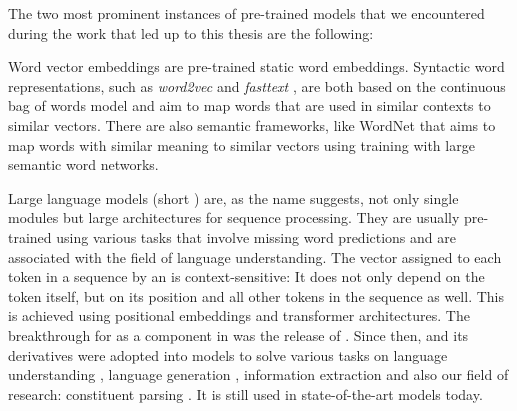 \documentclass[../document.tex]{subfiles}
\begin{document}
    The two most prominent instances of pre-trained models that we encountered during the work that led up to this thesis are the following:
    \begin{compactitem}
        \item
            Word vector embeddings are pre-trained static word embeddings.
            Syntactic word representations, such as \emph{word2vec} \citep{word2vec} and \emph{fasttext} \citep{fasttext}, are both based on the continuous bag of words model and aim to map words that are used in similar contexts to similar vectors.
            There are also semantic frameworks, like WordNet \citep{wordnet} that aims to map words with similar meaning to similar vectors using training with large semantic word networks.
        \item
            Large language models (short ) are, as the name suggests, not only single modules but large architectures for sequence processing.
            They are usually pre-trained using various tasks that involve missing word predictions and are associated with the field of language understanding.
            The vector assigned to each token in a sequence by an  is context-sensitive:
                It does not only depend on the token itself, but on its position and all other tokens in the sequence as well.
                This is achieved using positional embeddings and transformer architectures.
            The breakthrough for  as a component in  was the release of . \citep{Devlin2019}
            Since then,  and its derivatives were adopted into models to solve various tasks on language understanding \citep[question answering, entailment recognition, sentiment analysis, i.a.]{Devlin2019, roberta}, language generation \citep[summarization, translation, i.a.]{bertgeneration}, information extraction \citep[named entity recognition, relation extraction]{biobert} and also our field of research: constituent parsing \citep{Cor20, FerGom20a, FerGom22,Coa21, Sun22}.
            It is still used in state-of-the-art models today.
    \end{compactitem}
\end{document}
